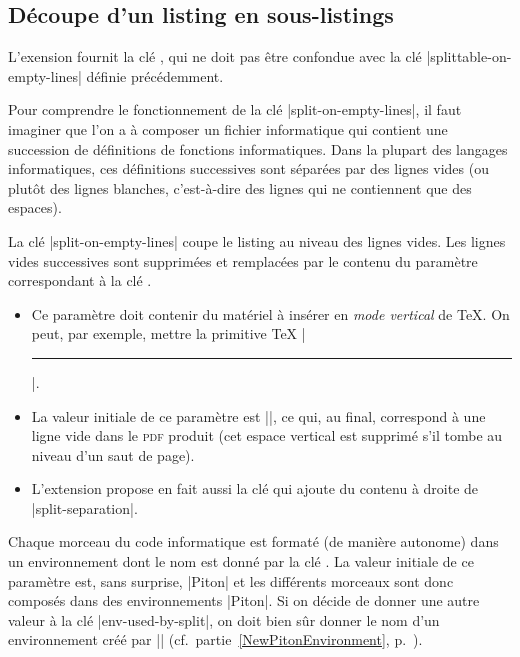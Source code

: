 \documentclass[dvipsnames,svgnames]{article}
\begin{document}
\bigskip
\subsection{Découpe d'un listing en sous-listings}

\label{split-on-empty-lines}

L'exension  fournit la clé , qui ne doit pas
être confondue avec la clé |splittable-on-empty-lines| définie précédemment. 

\smallskip
Pour comprendre le fonctionnement de la clé |split-on-empty-lines|, il faut imaginer que
l'on a à composer un fichier informatique qui contient une succession de définitions de
fonctions informatiques. Dans la plupart des langages informatiques, ces définitions
successives sont séparées par des lignes vides (ou plutôt des lignes blanches,
c'est-à-dire des lignes qui ne contiennent que des espaces). 

\smallskip
La clé |split-on-empty-lines| coupe le listing au niveau des lignes vides. Les lignes
vides successives sont supprimées et remplacées par le contenu du paramètre correspondant
à la clé .
\begin{itemize}
\item Ce paramètre doit contenir du matériel à insérer en \emph{mode vertical} de TeX. On
peut, par exemple, mettre la primitive TeX |\hrule|.

\item La valeur initiale de ce paramètre est |\vspace{\baselineskip}\vspace{-1.25pt}|, ce qui,
au final, correspond à une ligne vide dans le \textsc{pdf} produit (cet espace vertical
est supprimé s'il tombe au niveau d'un saut de page).

\item L'extension  propose en fait aussi la clé
 qui ajoute du contenu à droite de
|split-separation|.
\end{itemize}



Chaque morceau du code informatique est formaté (de manière autonome) dans un
environnement dont le nom est donné par la clé . La valeur
initiale de ce paramètre est, sans surprise, |Piton| et les différents morceaux sont donc
composés dans des environnements |{Piton}|. Si on décide de donner une autre valeur à la
clé |env-used-by-split|, on doit bien sûr donner le nom d'un environnement créé par
|\NewPitonEnvironment| (cf.~partie~\ref{NewPitonEnvironment},
p.~\pageref{NewPitonEnvironment}).
\end{document}
